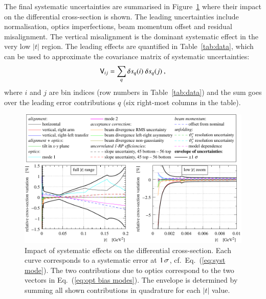 The final systematic uncertainties are summarised in Figure~\ref{fig:syst unc} where their impact on the differential cross-section is shown. The leading uncertainties include normalisation, optics imperfections, beam momentum offset and residual misalignment. The vertical misalignment is the dominant systematic effect in the very low $|t|$ region. The leading effects are quantified in Table~\ref{tab:data}, which can be used to approximate the covariance matrix of systematic uncertainties:
\begin{equation}
\label{eq:covar mat}
\mathsf{V}_{ij} = \sum_{q} \delta s_{q}(i)\ \delta s_{q}(j)\: ,
\end{equation}
where $i$ and $j$ are bin indices (row numbers in Table~\ref{tab:data}) and the sum goes over the leading error contributions $q$ (six right-most columns in the table).



\begin{figure}
\begin{center}
\includegraphics{fig/systematic_uncertainties.pdf}
\caption{%
Impact of systematic effects on the differential cross-section. Each curve corresponds to a systematic error at $1\,{\rm \sigma}$, cf.~Eq.~(\ref{eq:syst mode}). The two contributions due to optics correspond to the two vectors in Eq.~(\ref{eq:opt bias modes}). The envelope is determined by summing all shown contributions in quadrature for each $|t|$ value.
}
\label{fig:syst unc}
\end{center}
\end{figure}
